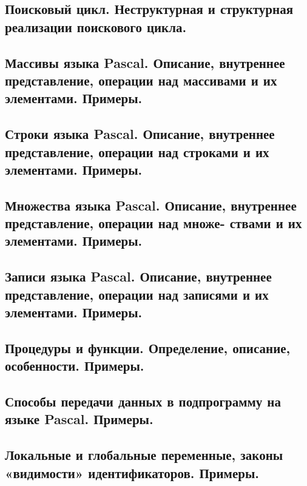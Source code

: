 \subsection{Поисковый цикл. Неструктурная и структурная реализации поискового цикла. }



\subsection{Массивы языка Pascal. Описание, внутреннее представление, операции над массивами и 
их элементами. Примеры. }



\subsection{Строки языка Pascal. Описание, внутреннее представление, операции над строками и их 
элементами. Примеры. }



\subsection{Множества  языка  Pascal.  Описание,  внутреннее  представление,  операции  над  множе-
ствами и их элементами. Примеры. }



\subsection{Записи языка Pascal. Описание, внутреннее представление, операции над записями и их 
элементами. Примеры. }



\subsection{Процедуры и функции. Определение, описание, особенности. Примеры. }



\subsection{Способы передачи данных в подпрограмму на языке Pascal. Примеры. }



\subsection{Локальные и глобальные переменные, законы «видимости» идентификаторов. Примеры. }



